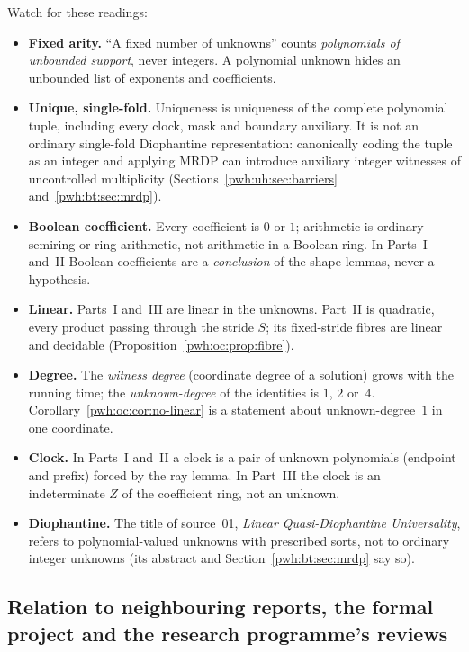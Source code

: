 \documentclass[11pt,letterpaper]{article}
\numberwithin{equation}{section}
\theoremstyle{definition}
\begin{document}
Watch for these readings:
\begin{itemize}
\item \textbf{Fixed arity.} ``A fixed number of unknowns'' counts
\emph{polynomials of unbounded support}, never integers. A polynomial
unknown hides an unbounded list of exponents and coefficients.
\item \textbf{Unique, single-fold.} Uniqueness is uniqueness of the
complete polynomial tuple, including every clock, mask and boundary
auxiliary. It is not an ordinary single-fold Diophantine representation:
canonically coding the tuple as an integer and applying MRDP can introduce
auxiliary integer witnesses of uncontrolled multiplicity (Sections~\ref{pwh:uh:sec:barriers}
and~\ref{pwh:bt:sec:mrdp}).
\item \textbf{Boolean coefficient.} Every coefficient is $0$ or $1$;
arithmetic is ordinary semiring or ring arithmetic, not arithmetic in a
Boolean ring. In Parts~I and~II Boolean coefficients are a
\emph{conclusion} of the shape lemmas, never a hypothesis.
\item \textbf{Linear.} Parts~I and~III are linear in the unknowns. Part~II
is quadratic, every product passing through the stride $S$; its fixed-stride
fibres are linear and decidable (Proposition~\ref{pwh:oc:prop:fibre}).
\item \textbf{Degree.} The \emph{witness degree} (coordinate degree of a
solution) grows with the running time; the \emph{unknown-degree} of the
identities is $1$, $2$ or~$4$. Corollary~\ref{pwh:oc:cor:no-linear} is a
statement about unknown-degree~$1$ in one coordinate.
\item \textbf{Clock.} In Parts~I and~II a clock is a pair of unknown
polynomials (endpoint and prefix) forced by the ray lemma. In Part~III the
clock is an indeterminate $Z$ of the coefficient ring, not an unknown.
\item \textbf{Diophantine.} The title of source~01, \emph{Linear
Quasi-Diophantine Universality}, refers to polynomial-valued unknowns with
prescribed sorts, not to ordinary integer unknowns (its abstract and
Section~\ref{pwh:bt:sec:mrdp} say so).
\end{itemize}

\subsection{Relation to neighbouring reports, the formal project and the research programme's reviews}\label{pwh:sec:relation}
\end{document}

